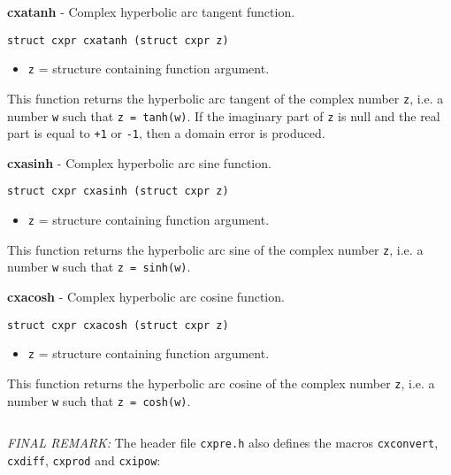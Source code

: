 \documentclass{article}
\begin{document}
\hrulefill{}

\textbf{cxatanh} - Complex hyperbolic arc tangent function.

\begin{verbatim}
struct cxpr cxatanh (struct cxpr z)
\end{verbatim}

\begin{itemize}
\item \texttt{z} = structure containing function argument.
\end{itemize}

This function returns the hyperbolic arc tangent of 
the complex number \texttt{z}, i.e. a number \texttt{w} such that
\texttt{z = tanh(w)}.
If the imaginary part of \texttt{z} is null and the
real part is equal to \texttt{+1} or \texttt{-1},
then a domain error is produced.


\hrulefill{}

\textbf{cxasinh} - Complex hyperbolic arc sine function.

\begin{verbatim}
struct cxpr cxasinh (struct cxpr z)
\end{verbatim}

\begin{itemize}
\item \texttt{z} = structure containing function argument.
\end{itemize}

This function  returns the hyperbolic arc sine of 
the complex number \texttt{z}, i.e. a number \texttt{w} such that
\texttt{z = sinh(w)}.


\hrulefill{}

\textbf{cxacosh} - Complex hyperbolic arc cosine function.

\begin{verbatim}
struct cxpr cxacosh (struct cxpr z)
\end{verbatim}

\begin{itemize}
\item \texttt{z} = structure containing function argument.
\end{itemize}

This function  returns the hyperbolic arc cosine of 
the complex number \texttt{z}, i.e. a number \texttt{w} such that 
\texttt{z = cosh(w)}.


\hrulefill{}

\begin{verbatim}

\end{verbatim}
\textit{FINAL REMARK:}
The header file \texttt{cxpre.h} also defines the macros
\texttt{cxconvert}, \texttt{cxdiff}, \texttt{cxprod} and \texttt{cxipow}:
\end{document}
